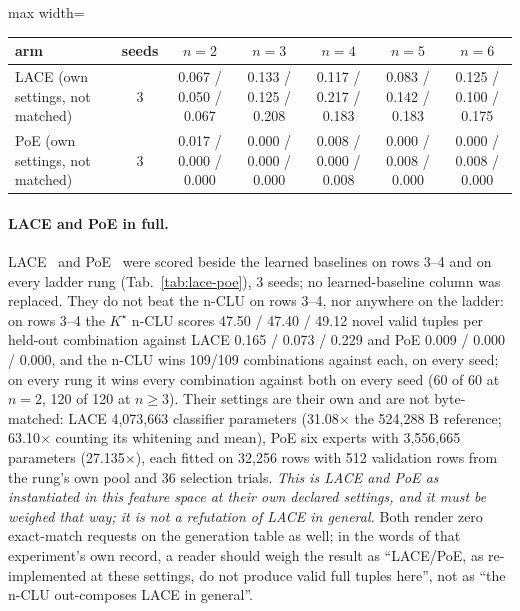 \documentclass{article} %
\newcommand{\Kstar}{\ensuremath{K^{\star}}}
\begin{document}
\begin{table}[h]
\medskip
\begin{adjustbox}{max width=\linewidth}\begin{tabular}{lcccccc}
\toprule
arm & seeds & $n=2$ & $n=3$ & $n=4$ & $n=5$ & $n=6$ \\
\midrule
LACE (own settings, not matched) & 3 & 0.067 / 0.050 / 0.067 & 0.133 / 0.125 / 0.208 & 0.117 / 0.217 / 0.183 & 0.083 / 0.142 / 0.183 & 0.125 / 0.100 / 0.175 \\
PoE (own settings, not matched) & 3 & 0.017 / 0.000 / 0.000 & 0.000 / 0.000 / 0.000 & 0.008 / 0.000 / 0.008 & 0.000 / 0.008 / 0.000 & 0.000 / 0.008 / 0.000 \\
\bottomrule
\end{tabular}\end{adjustbox}
\end{table}

\paragraph{LACE and PoE in full.}
LACE~\citep{nie2021controllable} and PoE~\citep{hinton2002training} were scored beside the
learned baselines on rows 3--4 and on every ladder rung (Tab.~\ref{tab:lace-poe}), 3 seeds; no
learned-baseline column was replaced. They do not beat the
n-CLU on rows 3--4, nor anywhere on the ladder: on rows 3--4 the $\Kstar$ n-CLU scores 47.50 / %
47.40 / 49.12 novel valid tuples per held-out combination against LACE 0.165 / 0.073 / 0.229 and PoE 0.009 / %
0.000 / 0.000, and the n-CLU wins 109/109 combinations against each, on every seed; on every rung it %
wins every combination against both on every seed (60 of 60 at $n=2$, 120 of 120 at $n\ge3$). %
Their settings are their own and are not byte-matched: LACE 4,073,663 classifier parameters %
(31.08$\times$ the 524,288 B reference; 63.10$\times$ counting its whitening and mean), PoE six %
experts with 3,556,665 parameters (27.135$\times$), each fitted on 32,256 rows with 512 validation %
rows from the rung's own pool and 36 selection trials. %
\emph{This is LACE and PoE as instantiated in this feature space at their own declared settings,
and it must be weighed that way; it is not a refutation of LACE in general.} Both render zero
exact-match requests on the generation table as well; in the words of that experiment's own record, a
reader should weigh the result as ``LACE/PoE, as re-implemented at these settings, do not produce
valid full tuples here'', not as ``the n-CLU out-composes LACE in general''. %
\end{document}
